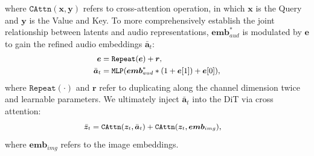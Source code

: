 where $\mathtt{CAttn}(\bm{x}, \bm{y})$ refers to cross-attention operation, in which $\bm{x}$ is the Query and $\bm{y}$ is the Value and Key. 
To more comprehensively establish the joint relationship between latents and audio representations, $\bm{emb}_{aud}^{*}$ is modulated by $\bm{e}$ to gain the refined audio embeddings $\bar{\bm{a}}_{t}$:
\begin{equation}\small
\label{eq:final_modulation}
\begin{aligned}
     \bm{e}&=\mathtt{Repeat}(\bm{e})+\bm{r}, \\
     \bar{\bm{a}}_{t}&=\mathtt{MLP}(\bm{emb}_{aud}^{*}*(1+\bm{e}[1])+\bm{e}[0]),
\end{aligned}
\end{equation}
where $\mathtt{Repeat}(\cdot)$ and $\bm{r}$ refer to duplicating along the channel dimension twice and learnable parameters.
We ultimately inject $\bar{\bm{a}}_{t}$ into the DiT via cross attention:
\begin{equation}\small
\label{eq:injection}
\begin{aligned}
     \bar{\bm{z}}_{t}&=\mathtt{CAttn}(\bm{z}_{t}, \bar{\bm{a}}_{t})+\mathtt{CAttn}(\bm{z}_{t},\bm{emb}_{img}),
\end{aligned}
\end{equation}
where $\bm{emb}_{img}$ refers to the image embeddings.

